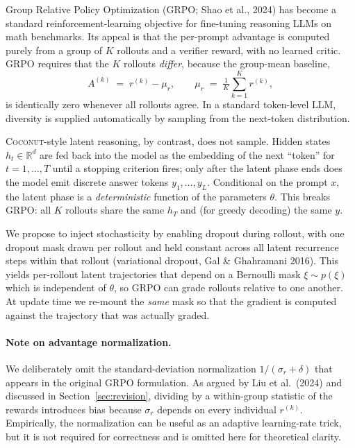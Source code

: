\documentclass[11pt]{article}
\theoremstyle{definition}
\theoremstyle{remark}
\newcommand{\R}{\mathbb{R}}
\begin{document}
Group Relative Policy Optimization (GRPO; Shao et al., 2024) has become a
standard reinforcement-learning objective for fine-tuning reasoning LLMs on
math benchmarks.  Its appeal is that the per-prompt advantage is computed
purely from a group of $K$ rollouts and a verifier reward, with no learned
critic.  GRPO requires that the $K$ rollouts \emph{differ}, because the
group-mean baseline,
\begin{equation}
A^{(k)} \;=\; r^{(k)} - \mu_r,
\qquad
\mu_r \;=\; \tfrac1K\sum_{k=1}^{K} r^{(k)},
\label{eq:grpo-advantage}
\end{equation}
is identically zero whenever all rollouts agree.  In a standard token-level
LLM, diversity is supplied automatically by sampling from the next-token
distribution.

\textsc{Coconut}-style latent reasoning, by contrast, does not sample.  Hidden
states $h_t \in \R^d$ are fed back into the model as the embedding of the next
``token'' for $t = 1, \dots, T$ until a stopping criterion fires; only after
the latent phase ends does the model emit discrete answer tokens
$y_1, \dots, y_L$.  Conditional on the prompt $x$, the latent phase is a
\emph{deterministic} function of the parameters $\theta$.  This breaks GRPO:
all $K$ rollouts share the same $h_T$ and (for greedy decoding) the same $y$.

We propose to inject stochasticity by enabling dropout during rollout, with
one dropout mask drawn per rollout and held constant across all latent
recurrence steps within that rollout (variational dropout, Gal \& Ghahramani
2016).  This yields per-rollout latent trajectories that depend on a
Bernoulli mask $\xi \sim p(\xi)$ which is independent of $\theta$, so GRPO
can grade rollouts relative to one another.  At update time we re-mount the
\emph{same} mask so that the gradient is computed against the trajectory
that was actually graded.

\paragraph{Note on advantage normalization.}
We deliberately omit the standard-deviation normalization
$1/(\sigma_r + \delta)$ that appears in the original GRPO formulation.  As
argued by Liu et al.\ (2024) and discussed in Section~\ref{sec:revision},
dividing by a within-group statistic of the rewards introduces bias because
$\sigma_r$ depends on every individual $r^{(k)}$.  Empirically, the
normalization can be useful as an adaptive learning-rate trick, but it is
not required for correctness and is omitted here for theoretical clarity.
\end{document}
